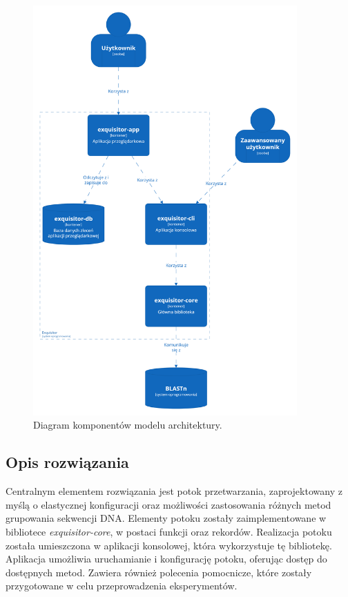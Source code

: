         \begin{figure}[!htb]
            \begin{center}
                \includegraphics[width=0.9\textwidth]{tex/pictures/app/c4_container.png}
            \end{center}
            \caption{
                Diagram komponentów modelu architektury.
            }\label{Picture:App:C4:Container}
        \end{figure}

    \subsection{Opis rozwiązania}

    Centralnym elementem rozwiązania jest potok przetwarzania, zaprojektowany z myślą o elastycznej konfiguracji oraz możliwości zastosowania różnych metod grupowania sekwencji DNA. Elementy potoku zostały zaimplementowane w bibliotece \textit{exquisitor-core}, w postaci funkcji oraz rekordów. Realizacja potoku została umieszczona w aplikacji konsolowej, która wykorzystuje tę bibliotekę. Aplikacja umożliwia uruchamianie i konfigurację potoku, oferując dostęp do dostępnych metod. Zawiera również polecenia pomocnicze, które zostały przygotowane w celu przeprowadzenia eksperymentów.

